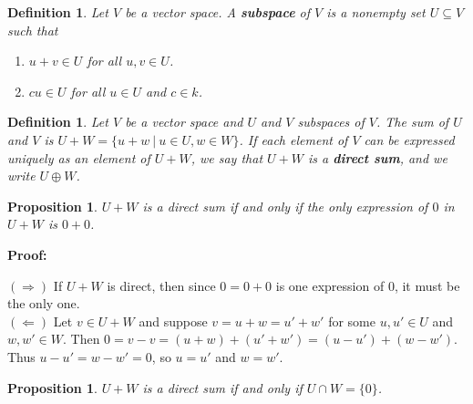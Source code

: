 \documentclass{article}
\theoremstyle{colontheorem}
\newtheorem{proposition}[theorem]{Proposition}
\newtheorem{definition}[theorem]{Definition}
\newenvironment{Proposition}
{
	\begin{mdframed}[backgroundcolor=TheoremOrange!10]
	\begin{proposition}
}
{
	\end{proposition}
	\end{mdframed}
	
	\vspace{.15in}
}
\newenvironment{Def}
{
	\begin{mdframed}[backgroundcolor=DefGreen!10]
	\begin{definition}
}
{
	\end{definition}
	\end{mdframed}
	
	\vspace{.15in}
}
\newenvironment{Proof}
{
	\vspace{-.3in}
	
	\begin{mdframed}[backgroundcolor=ProofPurple!10]
	\textbf{Proof:}%
}
{
	\end{mdframed}
	
	\vspace{.15in}
}
\begin{document}
\begin{Def}
	
	Let $V$ be a vector space. A \textbf{subspace} of $V$ is a nonempty set $U \subseteq V$ such that
	
	\begin{enumerate}
		
		\item $u+v \in U$ for all $u,v \in U$.
		
		\item $cu \in U$ for all $u \in U$ and $c \in k$.
		
	\end{enumerate}
	
\end{Def}



\begin{Def}
	
	Let $V$ be a vector space and $U$ and $V$ subspaces of $V$. The sum of $U$ and $V$ is $U+W = \{u+w\ |\ u \in U, w \in W\}$. If each element of $V$ can be expressed uniquely as an element of $U+W$, we say that $U+W$ is a \textbf{direct sum}, and we write $U \oplus W$.
	
\end{Def}



\begin{Proposition}
	
	$U+W$ is a direct sum if and only if the only expression of $0$ in $U+W$ is $0+0$.
	
\end{Proposition}



\begin{Proof}
	$(\Rightarrow)$ If $U+W$ is direct, then since $0 = 0+0$ is one expression of $0$, it must be the only one.\\
	
	$(\Leftarrow)$ Let $v \in U+W$ and suppose $v = u + w = u' + w'$ for some $u, u' \in U$ and $w, w' \in W$. Then $0 = v - v = (u+w) + (u'+w') = (u-u') + (w-w')$. Thus $u-u' = w-w' = 0$, so $u = u'$ and $w = w'$. 
	
\end{Proof}



\begin{Proposition}
	
	$U+W$ is a direct sum if and only if $U \cap W = \{0\}$.
	
\end{Proposition}
\end{document}
